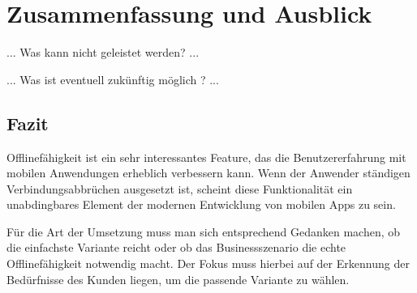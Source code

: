\chapter{Zusammenfassung und Ausblick}

... Was kann nicht geleistet werden? ...

... Was ist eventuell zukünftig möglich ? ...

\section{Fazit}

Offlinefähigkeit ist ein sehr interessantes Feature, das die Benutzererfahrung mit mobilen Anwendungen erheblich verbessern kann. Wenn der Anwender ständigen Verbindungsabbrüchen ausgesetzt ist, scheint diese Funktionalität ein unabdingbares Element der modernen Entwicklung von mobilen Apps zu sein.

Für die Art der Umsetzung muss man sich entsprechend Gedanken machen, ob die einfachste Variante reicht oder ob das Businessszenario die echte Offlinefähigkeit notwendig macht. Der Fokus muss hierbei auf der Erkennung der Bedürfnisse des Kunden liegen, um die passende Variante zu wählen.